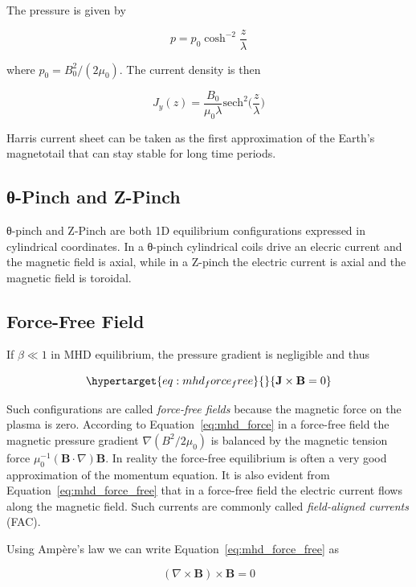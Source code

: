 \documentclass[
  notoc %
]{tufte-book}
\begin{document}
The pressure is given by

\[
p = p_0 \cosh^{-2}\frac{z}{\lambda}
\]

where \(p_0 = B_0^2/(2\mu_0)\). The current density is then

\[
J_y(z) = \frac{B_0}{\mu_0 \lambda}\text{sech}^2\Big(\frac{z}{\lambda}\Big)
\]

Harris current sheet can be taken as the first approximation of the
Earth's magnetotail that can stay stable for long time periods.

\hypertarget{ux3b8-pinch-and-z-pinch}{%
\subsection{θ-Pinch and Z-Pinch}\label{ux3b8-pinch-and-z-pinch}}

θ-pinch and Z-Pinch are both 1D equilibrium configurations expressed in
cylindrical coordinates. In a θ-pinch cylindrical coils drive an elecric
current and the magnetic field is axial, while in a Z-pinch the electric
current is axial and the magnetic field is toroidal.

\hypertarget{force-free-field}{%
\subsection{Force-Free Field}\label{force-free-field}}

If \(\beta\ll 1\) in MHD equilibrium, the pressure gradient is
negligible and thus

\begin{equation}\protect\hypertarget{eq:mhd_force_free}{}{
\mathbf{J}\times\mathbf{B} = 0
}\label{eq:mhd_force_free}\end{equation}

Such configurations are called \emph{force-free fields} because the
magnetic force on the plasma is zero. According to
Equation~\ref{eq:mhd_force} in a force-free field the magnetic pressure
gradient \(\nabla(B^2/2\mu_0)\) is balanced by the magnetic tension
force \(\mu_0^{-1}(\mathbf{B}\cdot\nabla)\mathbf{B}\). In reality the
force-free equilibrium is often a very good approximation of the
momentum equation. It is also evident from
Equation~\ref{eq:mhd_force_free} that in a force-free field the electric
current flows along the magnetic field. Such currents are commonly
called \emph{field-aligned currents} (FAC).

Using Ampère's law we can write Equation~\ref{eq:mhd_force_free} as

\[
(\nabla\times\mathbf{B})\times\mathbf{B} = 0
\]
\end{document}
